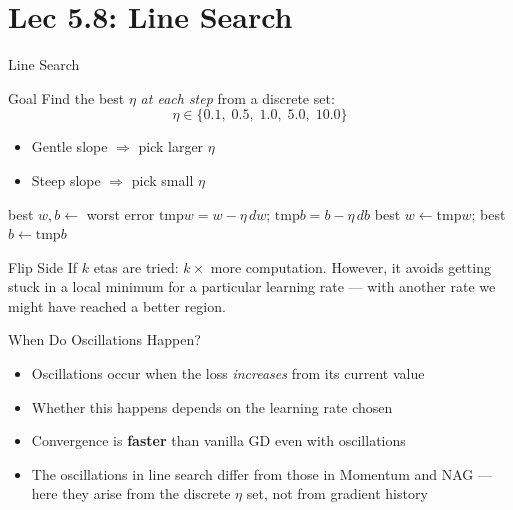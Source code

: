 \documentclass{beamer}
\begin{document}
\section{Lec 5.8: Line Search}

\begin{frame}[shrink=10]{Line Search}
  \begin{block}{Goal}
    Find the best $\eta$ \emph{at each step} from a discrete set:
    \[
      \eta \in \{0.1,\;0.5,\;1.0,\;5.0,\;10.0\}
    \]
    \begin{itemize}\setlength\itemsep{5pt}
      \item Gentle slope $\Rightarrow$ pick larger $\eta$
      \item Steep slope  $\Rightarrow$ pick small $\eta$
    \end{itemize}
  \end{block}

  \medskip

  \begin{algorithm}[H]
  \begin{algorithmic}[1]
    \STATE best $w,b \leftarrow$ worst error
      \STATE $\text{tmp}w = w - \eta\,dw$;\quad
             $\text{tmp}b = b - \eta\,db$
        \STATE best $w \leftarrow \text{tmp}w$;\quad
               best $b \leftarrow \text{tmp}b$
      \ENDIF
    \ENDFOR
  \end{algorithmic}
  \caption{Line Search}
  \end{algorithm}

  \medskip

  \begin{alertblock}{Flip Side}
    If $k$ etas are tried: $k\times$ more computation.
    However, it avoids getting stuck in a local minimum for a particular
    learning rate --- with another rate we might have reached a better
    region.
  \end{alertblock}
\end{frame}

\begin{frame}[shrink=10]{When Do Oscillations Happen?}
  \begin{itemize}\setlength\itemsep{8pt}
    \item Oscillations occur when the loss \emph{increases} from its
          current value
    \item Whether this happens depends on the learning rate chosen
    \item Convergence is \textbf{faster} than vanilla GD even with
          oscillations
    \item The oscillations in line search differ from those in Momentum
          and NAG --- here they arise from the discrete $\eta$ set,
          not from gradient history
  \end{itemize}
\end{frame}
\end{document}

